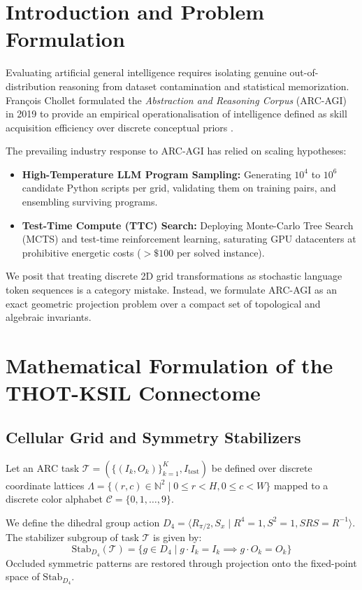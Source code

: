 \documentclass[11pt,a4paper]{article}
\begin{document}
\section{Introduction and Problem Formulation}

Evaluating artificial general intelligence requires isolating genuine out-of-distribution reasoning from dataset contamination and statistical memorization. François Chollet formulated the \textit{Abstraction and Reasoning Corpus} (ARC-AGI) in 2019 to provide an empirical operationalisation of intelligence defined as skill acquisition efficiency over discrete conceptual priors \cite{chollet2019measure}.

The prevailing industry response to ARC-AGI has relied on scaling hypotheses:
\begin{itemize}
    \item \textbf{High-Temperature LLM Program Sampling:} Generating $10^4$ to $10^6$ candidate Python scripts per grid, validating them on training pairs, and ensembling surviving programs.
    \item \textbf{Test-Time Compute (TTC) Search:} Deploying Monte-Carlo Tree Search (MCTS) and test-time reinforcement learning, saturating GPU datacenters at prohibitive energetic costs ($> \$100$ per solved instance).
\end{itemize}

We posit that treating discrete 2D grid transformations as stochastic language token sequences is a category mistake. Instead, we formulate ARC-AGI as an exact geometric projection problem over a compact set of topological and algebraic invariants.

\section{Mathematical Formulation of the THOT-KSIL Connectome}

\subsection{Cellular Grid and Symmetry Stabilizers}

Let an ARC task $\mathcal{T} = \left( \{ (I_k, O_k) \}_{k=1}^K, I_{\text{test}} \right)$ be defined over discrete coordinate lattices $\Lambda = \{ (r, c) \in \mathbb{N}^2 \mid 0 \le r < H, 0 \le c < W \}$ mapped to a discrete color alphabet $\mathcal{C} = \{0, 1, \dots, 9\}$.

We define the dihedral group action $D_4 = \langle R_{\pi/2}, S_x \mid R^4 = 1, S^2 = 1, S R S = R^{-1} \rangle$. The stabilizer subgroup of task $\mathcal{T}$ is given by:
\begin{equation}
\text{Stab}_{D_4}(\mathcal{T}) = \{ g \in D_4 \mid g \cdot I_k = I_k \implies g \cdot O_k = O_k \}
\end{equation}
Occluded symmetric patterns are restored through projection onto the fixed-point space of $\text{Stab}_{D_4}$.
\end{document}
